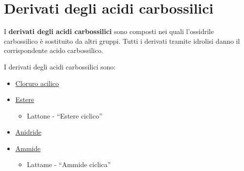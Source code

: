 \chapter{Derivati degli acidi carbossilici}
I \textbf{derivati degli acidi carbossilici} sono composti nei quali l'ossidrile carbossilico è sostituito da altri gruppi. Tutti i derivati tramite idrolisi danno il corrispondente acido carbossilico.

I derivati degli acidi carbossilici sono:

\begin{minipage}{.4\textwidth}
	\begin{itemize}
		\item \hyperref[sec:cloruriAcilici]{Cloruro acilico}
		      \begin{figure}[H]
			      \centering
		      \end{figure}
		\item \hyperref[sec:esteri]{Estere}
		      \begin{figure}[H]
			      \centering
		      \end{figure}
		      \begin{itemize}
			      \item Lattone - ``Estere ciclico''
			            \begin{figure}[H]
				            \centering
			            \end{figure}
		      \end{itemize}
	\end{itemize}
\end{minipage}
\begin{minipage}{.4\textwidth}
	\vspace{10pt}
	\begin{itemize}
		\item \hyperref[sec:anidridi]{Anidride}
		      \begin{figure}[H]
			      \centering
		      \end{figure}
		\item \hyperref[sec:ammidi]{Ammide}
		      \begin{figure}[H]
			      \centering
		      \end{figure}
		      \begin{itemize}
			      \item Lattame - ``Ammide ciclica''
			            \begin{figure}[H]
				            \centering
			            \end{figure}
		      \end{itemize}
	\end{itemize}
\end{minipage}

